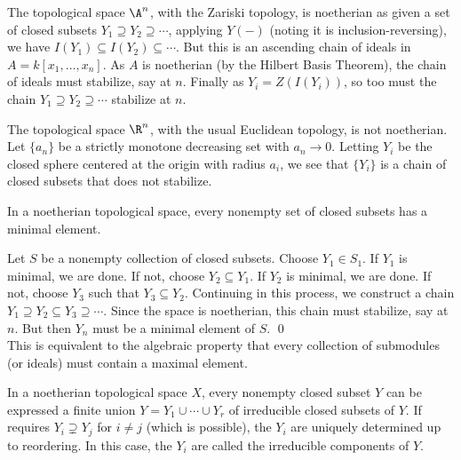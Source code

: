 \begin{ex}
The topological space $\A^n$, with the Zariski topology, is noetherian as given a set of closed subsets $Y_1 \supseteq Y_2 \supseteq \cdots$, applying $Y(-)$ (noting it is inclusion-reversing), we have $I(Y_1) \subseteq I(Y_2) \subseteq \cdots$. But this is an ascending chain of ideals in $A= k[x_1,\ldots,x_n]$. As $A$ is noetherian (by the Hilbert Basis Theorem), the chain of ideals must stabilize, say at $n$. Finally as $Y_i= Z(I(Y_i))$, so too must the chain $Y_1 \supseteq Y_2 \supseteq \cdots$ stabilize at $n$. \xqed
\end{ex}


\begin{ex}
The topological space $\R^n$, with the usual Euclidean topology, is not noetherian. Let $\{a_n\}$ be a strictly monotone decreasing set with $a_n \to 0$. Letting $Y_i$ be the closed sphere centered at the origin with radius $a_i$, we see that $\{Y_i\}$ is a chain of closed subsets that does not stabilize. \xqed
\end{ex}


\begin{prop}
In a noetherian topological space, every nonempty set of closed subsets has a minimal element.
\end{prop}

\pf Let $S$ be a nonempty collection of closed subsets. Choose $Y_1 \in S_1$. If $Y_1$ is minimal, we are done. If not, choose $Y_2 \subseteq Y_1$. If $Y_2$ is minimal, we are done. If not, choose $Y_3$ such that $Y_3 \subseteq Y_2$. Continuing in this process, we construct a chain $Y_1 \supseteq Y_2 \subseteq Y_3 \supseteq \cdots$. Since the space is noetherian, this chain must stabilize, say at $n$. But then $Y_n$ must be a minimal element of $S$. \qed \\


This is equivalent to the algebraic property that every collection of submodules (or ideals) must contain a maximal element. 


\begin{prop}
In a noetherian topological space $X$, every nonempty closed subset $Y$ can be expressed a finite union $Y= Y_1 \cup \cdots \cup Y_r$ of irreducible closed subsets of $Y$. If requires $Y_i \supsetneq Y_j$ for $i \neq j$ (which is possible), the $Y_i$ are uniquely determined up to reordering. In this case, the $Y_i$ are called the irreducible components of $Y$. 
\end{prop}

